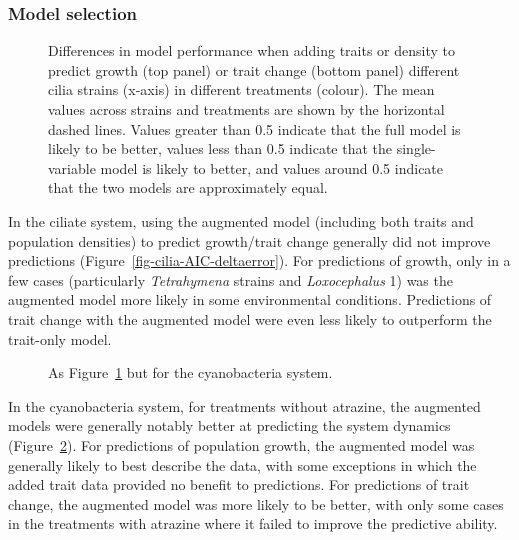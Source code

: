 \documentclass[
  letterpaper,
  DIV=11,
  numbers=noendperiod]{scrartcl}
\begin{document}
\subsubsection{Model selection}\label{model-selection}

\begin{figure}


\caption{\label{fig-cilia-AIC}Differences in model performance when
adding traits or density to predict growth (top panel) or trait change
(bottom panel) different cilia strains (x-axis) in different treatments
(colour). The mean values across strains and treatments are shown by the
horizontal dashed lines. Values greater than 0.5 indicate that the full
model is likely to be better, values less than 0.5 indicate that the
single-variable model is likely to better, and values around 0.5
indicate that the two models are approximately equal.}

\end{figure}%

In the ciliate system, using the augmented model (including both traits
and population densities) to predict growth/trait change generally did
not improve predictions (Figure~\ref{fig-cilia-AIC-deltaerror}). For
predictions of growth, only in a few cases (particularly
\emph{Tetrahymena} strains and \emph{Loxocephalus} 1) was the augmented
model more likely in some environmental conditions. Predictions of trait
change with the augmented model were even less likely to outperform the
trait-only model.

\begin{figure}


\caption{\label{fig-cyano-AIC}As Figure~\ref{fig-cilia-AIC} but for the
cyanobacteria system.}

\end{figure}%

In the cyanobacteria system, for treatments without atrazine, the
augmented models were generally notably better at predicting the system
dynamics (Figure~\ref{fig-cyano-AIC}). For predictions of population
growth, the augmented model was generally likely to best describe the
data, with some exceptions in which the added trait data provided no
benefit to predictions. For predictions of trait change, the augmented
model was more likely to be better, with only some cases in the
treatments with atrazine where it failed to improve the predictive
ability.
\end{document}
